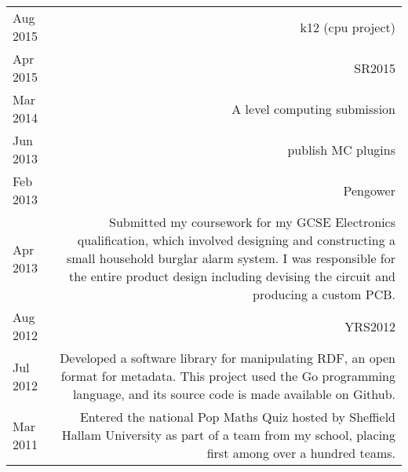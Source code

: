 

\begin{tabular}{L!{\sep}R}
    Aug 2015 & k12 (cpu project) \\
    Apr 2015 & SR2015 \\
    Mar 2014 & A level computing submission \\
    Jun 2013 & publish MC plugins \\
    Feb 2013 & Pengower \\
    Apr 2013 & Submitted my coursework for my GCSE Electronics qualification, which involved designing and constructing a small household burglar alarm system. I was responsible for the entire product design including devising the circuit and producing a custom PCB. \\
    Aug 2012 & YRS2012 \\
    Jul 2012 & Developed a software library for manipulating RDF, an open format for metadata. This project used the Go programming language, and its source code is made available on Github. \\
    Mar 2011 & Entered the national Pop Maths Quiz hosted by Sheffield Hallam University as part of a team from my school, placing first among over a hundred teams. \\
\end{tabular}
